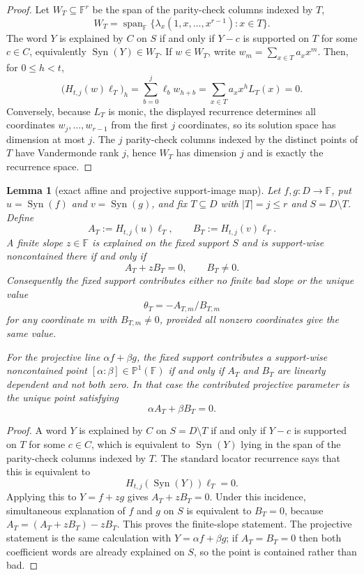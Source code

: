 \documentclass[11pt]{article}
\newtheorem{lemma}[lemma]{Lemma}
\theoremstyle{definition}
\theoremstyle{remark}
\newcommand{\F}{\mathbb{F}}
\newcommand{\Syn}{\operatorname{Syn}}
\begin{document}
\begin{proof}
Let $W_T\subseteq\F^r$ be the span of the parity-check columns indexed by $T$,
\[
        W_T=\operatorname{span}_\F\{\lambda_x(1,x,\ldots,x^{r-1}):x\in T\}.
\]
The word $Y$ is explained by $C$ on $S$ if and only if $Y-c$ is supported on $T$
for some $c\in C$, equivalently $\Syn(Y)\in W_T$.  If
$w\in W_T$, write $w_m=\sum_{x\in T}a_xx^m$.  Then, for $0\le h<t$,
\[
        \bigl(H_{t,j}(w)\boldsymbol\ell_T\bigr)_h
        =\sum_{b=0}^j\ell_b w_{h+b}
        =\sum_{x\in T}a_xx^hL_T(x)=0.
\]
Conversely, because $L_T$ is monic, the displayed recurrence determines all
coordinates $w_j,\ldots,w_{r-1}$ from the first $j$ coordinates, so its solution
space has dimension at most $j$.  The $j$ parity-check columns indexed by the
distinct points of $T$ have Vandermonde rank $j$, hence $W_T$ has dimension $j$
and is exactly the recurrence space.
\end{proof}

\begin{lemma}[exact affine and projective support-image map]
\label{lem:exact-line-image-map}
Let $f,g:D\to\F$, put $u=\Syn(f)$ and $v=\Syn(g)$, and fix
$T\subseteq D$ with $|T|=j\le r$ and $S=D\setminus T$.  Define
\[
        A_T:=H_{t,j}(u)\boldsymbol\ell_T,
        \qquad
        B_T:=H_{t,j}(v)\boldsymbol\ell_T .
\]
A finite slope $z\in\F$ is explained on the fixed support $S$ and is
support-wise noncontained there if and only if
\[
        A_T+zB_T=0,
        \qquad B_T\ne0 .
\]
Consequently the fixed support contributes either no finite bad slope or the
unique value
\[
        \theta_T=-A_{T,m}/B_{T,m}
\]
for any coordinate $m$ with $B_{T,m}\ne0$, provided all nonzero coordinates give
the same value.

For the projective line $\alpha f+\beta g$, the fixed support contributes a
support-wise noncontained point $[\alpha:\beta]\in\mathbb P^1(\F)$ if and only if
$A_T$ and $B_T$ are linearly dependent and not both zero.  In that case the
contributed projective parameter is the unique point satisfying
\[
        \alpha A_T+\beta B_T=0 .
\]
\end{lemma}

\begin{proof}
A word $Y$ is explained by $C$ on $S=D\setminus T$ if and only if
$Y-c$ is supported on $T$ for some $c\in C$, which is equivalent to
$\Syn(Y)$ lying in the span of the parity-check columns indexed by $T$.  The
standard locator recurrence says that this is equivalent to
\[
        H_{t,j}(\Syn(Y))\boldsymbol\ell_T=0 .
\]
Applying this to $Y=f+zg$ gives $A_T+zB_T=0$.  Under this incidence, simultaneous
explanation of $f$ and $g$ on $S$ is equivalent to $B_T=0$, because
$A_T=(A_T+zB_T)-zB_T$.  This proves the finite-slope statement.  The projective
statement is the same calculation with $Y=\alpha f+\beta g$; if
$A_T=B_T=0$ then both coefficient words are already explained on $S$, so the
point is contained rather than bad.
\end{proof}
\end{document}
